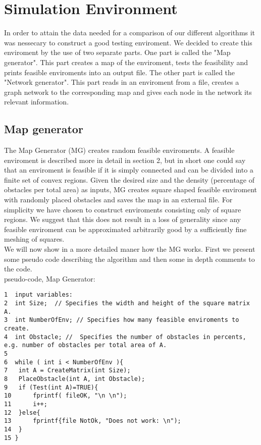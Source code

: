 \chapter{Simulation Environment}
In order to attain the data needed for a comparison of our different algorithms it was nessecary to construct a good testing enviroment. We decided to create this enviroment by the use of two separate parts. One part is called the "Map generator". This part creates a map of the enviroment, tests the feasibility and prints feasible enviroments into an output file. The other part is called the "Network generator". This part reads in an enviroment from a file, creates a graph network to the corresponding map and gives each node in the network its relevant information.\\

\section{Map generator}
The Map Generator (MG) creates random feasible enviroments. A feasible enviroment is described more in detail in section 2, but in short one could say that an enviroment is feasible if it is simply connected and can be divided into a finite set of convex regions. Given the desired size and the density (percentage of obstacles per total area) as inputs, MG creates square shaped feasible enviroment with randomly placed obstacles and saves the map in an external file. For simplicity we have chosen to construct enviroments consisting only of square regions. We suggest that this does not result in a loss of generality since any feasible enviroment can be approximated arbitrarily good by a sufficiently fine meshing of squares. \\
We will now show in a more detailed maner how the MG works. First we present some pseudo code describing the algorithm and then some in depth comments to the code.\\
pseudo-code, Map Generator:
\begin{verbatim}
1  input variables:
2  int Size;  // Specifies the width and height of the square matrix  A.
3  int NumberOfEnv; // Specifies how many feasible enviroments to create.
4  int Obstacle; //  Specifies the number of obstacles in percents, e.g. number of obstacles per total area of A.
5  
6  while ( int i < NumberOfEnv ){
7  	int A = CreateMatrix(int Size); 
8  	PlaceObstacle(int A, int Obstacle);
9  	if (Test(int A)=TRUE){ 
10 		fprintf( fileOK, "\n \n");
11 		i++;
12 	}else{
13 		fprintf{file NotOk, "Does not work: \n");
14 	}
15 }
\end{verbatim}

